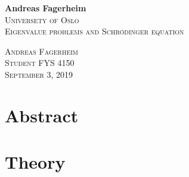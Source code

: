 \documentclass{article}
\renewcommand{\headrulewidth}{1pt}
\renewcommand{\footrulewidth}{1pt}
\begin{document}
\begin{titlepage}
	\begin{center}
		\huge{\bfseries Andreas Fagerheim}	\\
		[5cm]
		\textsc{Universety of Oslo}\\
		[1cm]
		\textsc{Eigenvalue problems and Schrödinger equation}\\
		[8cm]
	\end{center}
	\begin{flushright}
	\textsc{Andreas Fagerheim \\
	Student FYS 4150\\
	September 3, 2019}
	\end{flushright}
\end{titlepage}
\section*{Abstract}
\renewcommand{\headrulewidth}{0pt}
\renewcommand{\footrulewidth}{0pt}
\cleardoublepage
\tableofcontents
\thispagestyle{empty}
\cleardoublepage
\renewcommand{\headrulewidth}{1pt}
\renewcommand{\footrulewidth}{1pt}
\setcounter{page}{1}
\section{Theory}\label{sec:theory}
\end{document}
